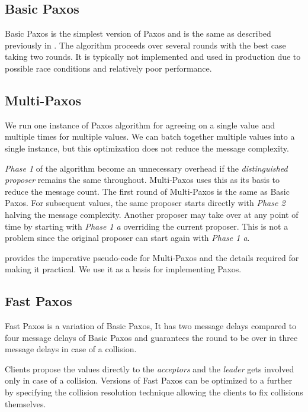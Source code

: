 \subsection{Basic Paxos}

Basic Paxos is the simplest version of Paxos and is the same as described
previously in . The algorithm proceeds over several rounds
with the best case taking two rounds. It is typically not implemented and used
in production due to possible race conditions and relatively poor performance.

\subsection{Multi-Paxos}

We run one instance of Paxos algorithm for agreeing on a single value and
multiple times for multiple values. We can batch together multiple values
into a single instance, but this optimization does not reduce the message
complexity.

\emph{Phase 1} of the algorithm become
an unnecessary overhead if the \emph{distinguished proposer} remains the same
throughout. Multi-Paxos uses this as its basis to reduce the message count.
The first round of Multi-Paxos is the same as Basic Paxos. For subsequent
values, the same
proposer starts directly with \emph{Phase 2} halving the message complexity.
Another proposer may take over at any point of time by starting with
\emph{Phase 1 a} overriding the current proposer. This is not a problem since
the original proposer can start again with \emph{Phase 1 a}.

\citet{Robbert2011} provides the imperative pseudo-code for Multi-Paxos and
the details required for making it practical. We use it as a
basis for implementing Paxos.

\subsection{Fast Paxos}

Fast Paxos \citep{MSRTR2005112} is a variation of Basic Paxos, It has two
message delays compared to four message delays of Basic Paxos and guarantees
the round to be over in three message delays in case of a collision.

Clients propose the values directly to the \emph{acceptors} and the
\emph{leader} gets involved only in case of a collision. Versions of Fast
Paxos can be optimized to a further by specifying the collision
resolution technique allowing the clients to fix collisions themselves.

